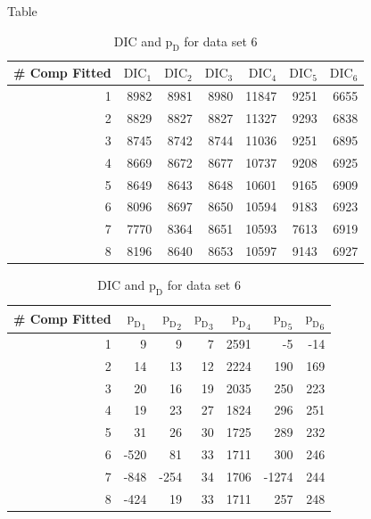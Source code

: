 Table 

\begin{table}[!htb]
\centering
\caption{DIC and $\text{p}_\text{D}$ for data set 6}
\label{table : ds_5wellsep_dic}
\begin{tabular}{@{}rrrrrrr@{}}
\toprule
\# Comp Fitted & $\text{DIC}_1$ & $\text{DIC}_2$  & $\text{DIC}_3$  & $\text{DIC}_4$  & $\text{DIC}_5$  & $\text{DIC}_6$  \\ \midrule
1 & 8982 & 8981 & 8980 & 11847 & 9251 & 6655 \\
2 & 8829 & 8827 & 8827 & 11327 & 9293 & 6838 \\
3 & 8745 & 8742 & 8744 & 11036 & 9251 & 6895 \\
4 & 8669 & 8672 & 8677 & 10737 & 9208 & 6925 \\
5 & 8649 & 8643 & 8648 & 10601 & 9165 & 6909 \\
6 & 8096 & 8697 & 8650 & 10594 & 9183 & 6923 \\
7 & 7770 & 8364 & 8651 & 10593 & 7613 & 6919 \\
8 & 8196 & 8640 & 8653 & 10597 & 9143 & 6927 \\ \bottomrule
\end{tabular}

\begin{tabular}{@{}rrrrrrr@{}}
\toprule
\# Comp Fitted & ${\text{p}_\text{D}}_1$ & ${\text{p}_\text{D}}_2$ & ${\text{p}_\text{D}}_3$ & ${\text{p}_\text{D}}_4$ & ${\text{p}_\text{D}}_5$ & ${\text{p}_\text{D}}_6$ \\ \midrule
1 & 9 & 9 & 7 & 2591 & -5 & -14 \\
2 & 14 & 13 & 12 & 2224 & 190 & 169 \\
3 & 20 & 16 & 19 & 2035 & 250 & 223 \\
4 & 19 & 23 & 27 & 1824 & 296 & 251 \\
5 & 31 & 26 & 30 & 1725 & 289 & 232 \\
6 & -520 & 81 & 33 & 1711 & 300 & 246 \\
7 & -848 & -254 & 34 & 1706 & -1274 & 244 \\
8 & -424 & 19 & 33 & 1711 & 257 & 248 \\ \bottomrule
\end{tabular}
\end{table}


